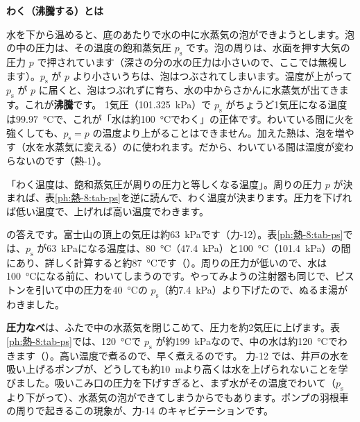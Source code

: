 \noindent\textbf{わく（沸騰する）とは}\par\nobreak
水を下から温めると、底のあたりで水の中に水蒸気の泡ができようとします。泡の中の圧力は、その温度の飽和蒸気圧 $p_{\mathrm s}$ です。泡の周りは、水面を押す大気の圧力 $p$ で押されています（深さの分の水の圧力は小さいので、ここでは無視します）。$p_{\mathrm s}$ が $p$ より小さいうちは、泡はつぶされてしまいます。温度が上がって $p_{\mathrm s}$ が $p$ に届くと、泡はつぶれずに育ち、水の中からさかんに水蒸気が出てきます。これが\textbf{沸騰}です。
\label{ph:熱-8:futten}1気圧（\qty{101.325}{kPa}）で $p_{\mathrm s}$ がちょうど1気圧になる温度は\qty{99.97}{\celsius}で、これが「水は約\qty{100}{\celsius}でわく」の正体です。わいている間に火を強くしても、$p_{\mathrm s}=p$ の温度より上がることはできません。加えた熱は、泡を増やす（水を水蒸気に変える）のに使われます。だから、わいている間は温度が変わらないのです（熱-1）。

\begin{phyomi}[$p_{\mathrm s}(T)=p$]
「わく温度は、飽和蒸気圧が周りの圧力と等しくなる温度」。周りの圧力 $p$ が決まれば、表\ref{ph:熱-8:tab-ps}を逆に読んで、わく温度が決まります。圧力を下げれば低い温度で、上げれば高い温度でわきます。
\end{phyomi}

\bkhatenaref の答えです。富士山の頂上の気圧は約\qty{63}{kPa}です（力-12）。表\ref{ph:熱-8:tab-ps}では、$p_{\mathrm s}$ が\qty{63}{kPa}になる温度は、\qty{80}{\celsius}（\qty{47.4}{kPa}）と\qty{100}{\celsius}（\qty{101.4}{kPa}）の間にあり、詳しく計算すると約\qty{87}{\celsius}です（）。周りの圧力が低いので、水は\qty{100}{\celsius}になる前に、わいてしまうのです。やってみようの注射器も同じで、ピストンを引いて中の圧力を\qty{40}{\celsius}の $p_{\mathrm s}$（約\qty{7.4}{kPa}）より下げたので、ぬるま湯がわきました。

\begin{phmijika}
\textbf{圧力なべ}は、ふたで中の水蒸気を閉じこめて、圧力を約2気圧に上げます。表\ref{ph:熱-8:tab-ps}では、\qty{120}{\celsius}で $p_{\mathrm s}$ が約\qty{199}{kPa}なので、中の水は約\qty{120}{\celsius}でわきます（）。高い温度で煮るので、早く煮えるのです。
力-12 では、井戸の水を吸い上げるポンプが、どうしても約\qty{10}{m}より高くは水を上げられないことを学びました。吸いこみ口の圧力を下げすぎると、まず水がその温度でわいて（$p_{\mathrm s}$ より下がって）、水蒸気の泡ができてしまうからでもあります。ポンプの羽根車の周りで起きるこの現象が、力-14 のキャビテーションです。
\end{phmijika}

